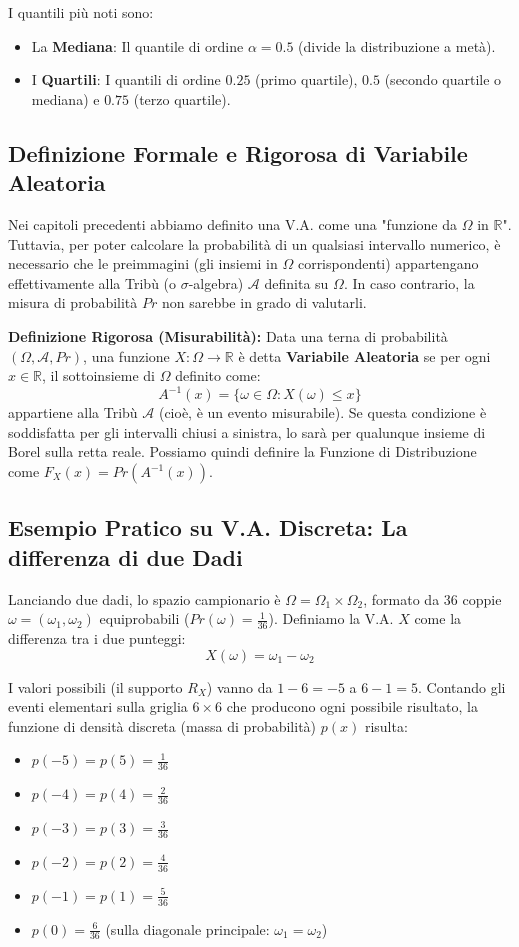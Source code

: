 \documentclass[12pt, a4paper]{article}
\begin{document}
I quantili più noti sono:
\begin{itemize}
    \item La \textbf{Mediana}: Il quantile di ordine $\alpha = 0.5$ (divide la distribuzione a metà).
    \item I \textbf{Quartili}: I quantili di ordine $0.25$ (primo quartile), $0.5$ (secondo quartile o mediana) e $0.75$ (terzo quartile).
\end{itemize}

\subsection{Definizione Formale e Rigorosa di Variabile Aleatoria}
Nei capitoli precedenti abbiamo definito una V.A. come una "funzione da $\Omega$ in $\mathbb{R}$". Tuttavia, per poter calcolare la probabilità di un qualsiasi intervallo numerico, è necessario che le preimmagini (gli insiemi in $\Omega$ corrispondenti) appartengano effettivamente alla Tribù (o $\sigma$-algebra) $\mathcal{A}$ definita su $\Omega$. In caso contrario, la misura di probabilità $Pr$ non sarebbe in grado di valutarli.

\textbf{Definizione Rigorosa (Misurabilità):} Data una terna di probabilità $(\Omega, \mathcal{A}, Pr)$, una funzione $X: \Omega \to \mathbb{R}$ è detta \textbf{Variabile Aleatoria} se per ogni $x \in \mathbb{R}$, il sottoinsieme di $\Omega$ definito come:
$$ A^{-1}(x) = \{\omega \in \Omega : X(\omega) \le x\} $$
appartiene alla Tribù $\mathcal{A}$ (cioè, è un evento misurabile). 
Se questa condizione è soddisfatta per gli intervalli chiusi a sinistra, lo sarà per qualunque insieme di Borel sulla retta reale.
Possiamo quindi definire la Funzione di Distribuzione come $F_X(x) = Pr(A^{-1}(x))$.

\subsection{Esempio Pratico su V.A. Discreta: La differenza di due Dadi}
Lanciando due dadi, lo spazio campionario è $\Omega = \Omega_1 \times \Omega_2$, formato da 36 coppie $\omega = (\omega_1, \omega_2)$ equiprobabili ($Pr(\omega) = \frac{1}{36}$).
Definiamo la V.A. $X$ come la differenza tra i due punteggi:
$$ X(\omega) = \omega_1 - \omega_2 $$

I valori possibili (il supporto $R_X$) vanno da $1-6 = -5$ a $6-1 = 5$.
Contando gli eventi elementari sulla griglia $6 \times 6$ che producono ogni possibile risultato, la funzione di densità discreta (massa di probabilità) $p(x)$ risulta:
\begin{itemize}
    \item $p(-5) = p(5) = \frac{1}{36}$
    \item $p(-4) = p(4) = \frac{2}{36}$
    \item $p(-3) = p(3) = \frac{3}{36}$
    \item $p(-2) = p(2) = \frac{4}{36}$
    \item $p(-1) = p(1) = \frac{5}{36}$
    \item $p(0) = \frac{6}{36}$ (sulla diagonale principale: $\omega_1 = \omega_2$)
\end{itemize}
\end{document}
